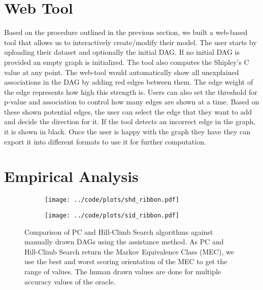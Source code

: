\documentclass[letterpaper]{article} %
\begin{document}
\section{Web Tool}
\label{sec:web}
Based on the procedure outlined in the previous section, we built a web-based
tool that allows us to interactively create/modify their model. The user
starts by uploading their dataset and optionally the initial DAG. If no initial
DAG is provided an empty graph is initialized. The tool also computes the
Shipley's C value at any point. The web-tool would automatically show all
unexplained associations in the DAG by adding red edges between them. The edge
weight of the edge represents how high this strength is. Users can also set the
threshold for p-value and association to control how many edges are shown at a
time. Based on these shown potential edges, the user can select the edge that
they want to add and decide the direction for it. If the tool detects an
incorrect edge in the graph, it is shown in black. Once the user is happy with
the graph they have they can export it into different formats to use it for
further computation.



\section{Empirical Analysis}
\label{sec:empirical}

\begin{figure}
	\begin{subfigure}{0.5\textwidth}
		\centering
		\texttt{[image: ../code/plots/shd\_ribbon.pdf]}
		\caption{}
	\end{subfigure}
	\begin{subfigure}{0.5\textwidth}
		\centering
		\texttt{[image: ../code/plots/sid\_ribbon.pdf]}
		\caption{}
	\end{subfigure}
	\caption{Comparison of PC and Hill-Climb Search algorithms against
		manually drawn DAGs using the assistance method. As PC and
		Hill-Climb Search return the Markov Equivalence Class (MEC), we
		use the best and worst scoring orientation of the MEC to get
		the range of values. The human drawn values are done for
	multiple accuracy values of the oracle. }
\end{figure}
\end{document}
